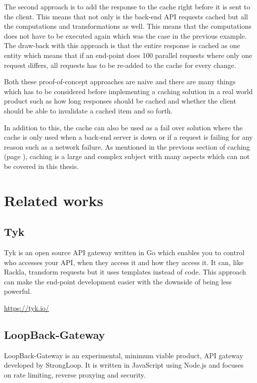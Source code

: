 \documentclass{cslthse-msc}
\begin{document}
The second approach is to add the response to the cache right before it is sent to the client. This means that not only is the back-end API requests cached but all the computations and transformations as well. This means that the computations does not have to be executed again which was the case in the previous example. The draw-back with this approach is that the entire response is cached as one entity which means that if an end-point does 100 parallel requests where only one request differs, all requests has to be re-added to the cache for every change.

Both these proof-of-concept approaches are naive and there are many things which has to be considered before implementing a caching solution in a real world product such as how long responses should be cached and whether the client should be able to invalidate a cached item and so forth. 

In addition to this, the cache can also be used as a fail over solution where the cache is only used when a back-end server is down or if a request is failing for any reason such as a network failure. As mentioned in the previous section of caching (page \pageref{caching}), caching is a large and complex subject with many aspects which can not be covered in this thesis.

\section{Related works}
\subsection{Tyk}

Tyk is an open source API gateway written in Go which enables you to control who accesses your API, when they access it and how they access it. It can, like Rackla, transform requests but it uses templates instead of code. This approach can make the end-point development easier with the downside of being less powerful.

\vspace{5mm}

\noindent \url{https://tyk.io/}

\subsection{LoopBack-Gateway}

LoopBack-Gateway is an experimental, minimum viable product, API gateway developed by StrongLoop. It is written in JavaScript using Node.js and focuses on rate limiting, reverse proxying and security.
\end{document}
